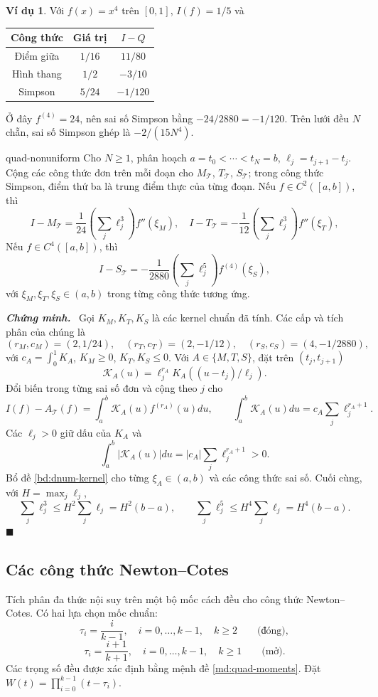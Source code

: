\documentclass[12pt,a4paper,oneside]{book}
\numberwithin{algorithm}{chapter}
\theoremstyle{definition}
\newtheorem{vidu}{Ví dụ}[chapter]
\newenvironment{chungminh}{\par\medskip\noindent\textbf{\textit{\color{mainblue}Chứng minh.}}\ }{\hfill$\blacksquare$\par\medskip}
\begin{document}
\begin{vidu}
Với $f(x)=x^4$ trên $[0,1]$, $I(f)=1/5$ và
\begin{center}
\begin{tabular}{c|c|c}
\toprule
Công thức & Giá trị & $I-Q$\\
\midrule
Điểm giữa & $1/16$ & $11/80$\\
Hình thang & $1/2$ & $-3/10$\\
Simpson & $5/24$ & $-1/120$\\
\bottomrule
\end{tabular}
\end{center}
Ở đây $f^{(4)}=24$, nên sai số Simpson bằng $-24/2880=-1/120$. Trên lưới đều $N$ chẵn, sai số Simpson ghép là $-2/(15N^4)$.
\end{vidu}

\begin{menhde}{}{quad-nonuniform}
Cho $N\geq1$, phân hoạch $a=t_0<\cdots<t_N=b$, $\ell_j=t_{j+1}-t_j$. Cộng các công thức đơn trên mỗi đoạn cho $M_{\mathcal T}$, $T_{\mathcal T}$, $S_{\mathcal T}$; trong công thức Simpson, điểm thứ ba là trung điểm thực của từng đoạn. Nếu $f\in C^2([a,b])$, thì
\[
 I-M_{\mathcal T}=\frac1{24}\left(\sum_j\ell_j^3\right)f''(\xi_M),\quad
 I-T_{\mathcal T}=-\frac1{12}\left(\sum_j\ell_j^3\right)f''(\xi_T),
\]
Nếu $f\in C^4([a,b])$, thì
\[
 I-S_{\mathcal T}=-\frac1{2880}\left(\sum_j\ell_j^5\right)f^{(4)}(\xi_S),
\]
với $\xi_M,\xi_T,\xi_S\in(a,b)$ trong từng công thức tương ứng.
\end{menhde}
\begin{chungminh}
Gọi $K_M,K_T,K_S$ là các kernel chuẩn đã tính. Các cấp và tích phân của chúng là
\[
 (r_M,c_M)=(2,1/24),\quad(r_T,c_T)=(2,-1/12),\quad(r_S,c_S)=(4,-1/2880),
\]
với $c_A=\int_0^1K_A$, $K_M\geq0$, $K_T,K_S\leq0$. Với $A\in\{M,T,S\}$, đặt trên $(t_j,t_{j+1})$
\[
 \mathcal K_A(u)=\ell_j^{r_A}K_A((u-t_j)/\ell_j).
\]
Đổi biến trong từng sai số đơn và cộng theo $j$ cho
\[
 I(f)-A_{\mathcal T}(f)=\int_a^b\mathcal K_A(u)f^{(r_A)}(u)du,
 \qquad\int_a^b\mathcal K_A(u)du=c_A\sum_j\ell_j^{r_A+1}.
\]
Các $\ell_j>0$ giữ dấu của $K_A$ và
\[
 \int_a^b|\mathcal K_A(u)|du=|c_A|\sum_j\ell_j^{r_A+1}>0.
\]
Bổ đề \ref{bd:dnum-kernel} cho từng $\xi_A\in(a,b)$ và các công thức sai số. Cuối cùng, với $H=\max_j\ell_j$,
\[
 \sum_j\ell_j^3\leq H^2\sum_j\ell_j=H^2(b-a),\qquad
 \sum_j\ell_j^5\leq H^4\sum_j\ell_j=H^4(b-a).
\]
\end{chungminh}

\subsection{Các công thức Newton--Cotes}
Tích phân đa thức nội suy trên một bộ mốc cách đều cho công thức Newton--Cotes. Có hai lựa chọn mốc chuẩn:
\[
 \tau_i=\frac{i}{k-1},\quad i=0,\ldots,k-1,\quad k\geq2
 \qquad\text{(đóng)},
\]
\[
 \tau_i=\frac{i+1}{k+1},\quad i=0,\ldots,k-1,\quad k\geq1
 \qquad\text{(mở)}.
\]
Các trọng số đều được xác định bằng mệnh đề \ref{md:quad-moments}. Đặt $W(t)=\prod_{i=0}^{k-1}(t-\tau_i)$.
\end{document}
